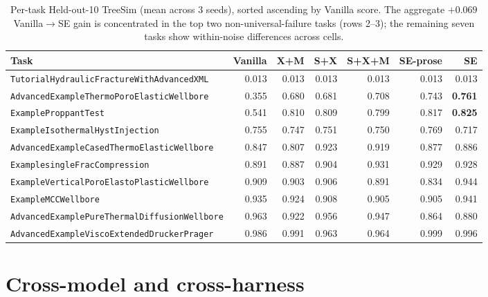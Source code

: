 \documentclass{article}
\begin{document}
\begin{table}[h]
  \caption{Per-task Held-out-10 TreeSim (mean across 3 seeds), sorted ascending by Vanilla score. The aggregate $+0.069$ Vanilla$\to$SE gain is concentrated in the top two non-universal-failure tasks (rows 2--3); the remaining seven tasks show within-noise differences across cells.}
  \label{tab:per-task-icl10}
  \centering
  \footnotesize
  \begin{tabular}{lrrrrrr}
    \toprule
    \textbf{Task} & \textbf{Vanilla} & \textbf{X+M} & \textbf{S+X} & \textbf{S+X+M} & \textbf{SE-prose} & \textbf{SE} \\
    \midrule
    \texttt{TutorialHydraulicFractureWithAdvancedXML}      & 0.013 & 0.013 & 0.013 & 0.013 & 0.013 & 0.013 \\
    \texttt{AdvancedExampleThermoPoroElasticWellbore}      & 0.355 & 0.680 & 0.681 & 0.708 & 0.743 & \textbf{0.761} \\
    \texttt{ExampleProppantTest}                           & 0.541 & 0.810 & 0.809 & 0.799 & 0.817 & \textbf{0.825} \\
    \texttt{ExampleIsothermalHystInjection}                & 0.755 & 0.747 & 0.751 & 0.750 & 0.769 & 0.717 \\
    \texttt{AdvancedExampleCasedThermoElasticWellbore}     & 0.847 & 0.807 & 0.923 & 0.919 & 0.877 & 0.886 \\
    \texttt{ExamplesingleFracCompression}                  & 0.891 & 0.887 & 0.904 & 0.931 & 0.929 & 0.928 \\
    \texttt{ExampleVerticalPoroElastoPlasticWellbore}      & 0.909 & 0.903 & 0.906 & 0.891 & 0.834 & 0.944 \\
    \texttt{ExampleMCCWellbore}                            & 0.935 & 0.924 & 0.908 & 0.905 & 0.905 & 0.941 \\
    \texttt{AdvancedExamplePureThermalDiffusionWellbore}   & 0.963 & 0.922 & 0.956 & 0.947 & 0.864 & 0.880 \\
    \texttt{AdvancedExampleViscoExtendedDruckerPrager}     & 0.986 & 0.991 & 0.963 & 0.964 & 0.999 & 0.996 \\
    \bottomrule
  \end{tabular}
\end{table}

\section{Cross-model and cross-harness}
\label{app:cross-model}
\end{document}
